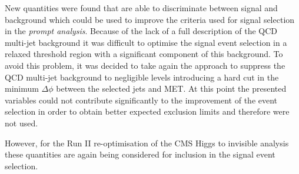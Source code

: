 
New quantities were found that are able to discriminate between signal and background which could be used to improve the criteria used for signal selection in the \textit{prompt analysis}. Because of the lack of a full description of the \gls{QCD} multi-jet background it was difficult to optimise the signal event selection in a relaxed threshold region with a significant component of this background. To avoid this problem, it was decided to take again the approach to suppress the \gls{QCD} multi-jet background to negligible levels introducing a hard cut in the minimum $\Delta\phi$ between the selected jets and \gls{MET}. At this point the presented variables could not contribute significantly to the improvement of the event selection in order to obtain better expected exclusion limits and therefore were not used.

However, for the Run II re-optimisation of the \gls{CMS} Higgs to invisible analysis these quantities are again being considered for inclusion in the signal event selection.
